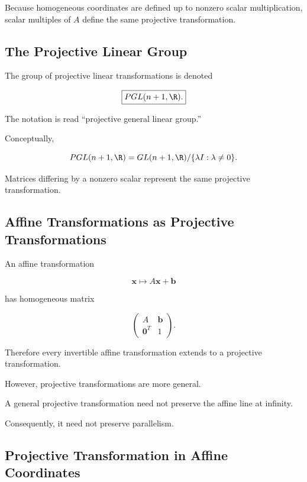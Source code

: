 Because homogeneous coordinates are defined up to nonzero scalar
multiplication, scalar multiples of \(A\) define the same projective
transformation.

\subsection{The Projective Linear Group}
\label{subsec:projective-linear-group}

The group of projective linear transformations is denoted

\[
\boxed{
PGL(n+1,\R).
}
\]

The notation is read ``projective general linear group.''

Conceptually,

\[
PGL(n+1,\R)
=
GL(n+1,\R)
/\{\lambda I:\lambda\neq0\}.
\]

Matrices differing by a nonzero scalar represent the same projective
transformation.

\subsection{Affine Transformations as Projective Transformations}
\label{subsec:affine-as-projective}

An affine transformation

\[
\mathbf{x}\mapsto A\mathbf{x}+\mathbf{b}
\]

has homogeneous matrix

\[
\begin{pmatrix}
A&\mathbf{b}\\
\mathbf{0}^{T}&1
\end{pmatrix}.
\]

Therefore every invertible affine transformation extends to a projective
transformation.

However, projective transformations are more general.

A general projective transformation need not preserve the affine line at
infinity.

Consequently, it need not preserve parallelism.

\subsection{Projective Transformation in Affine Coordinates}
\label{subsec:projective-transformation-affine-coordinates}

